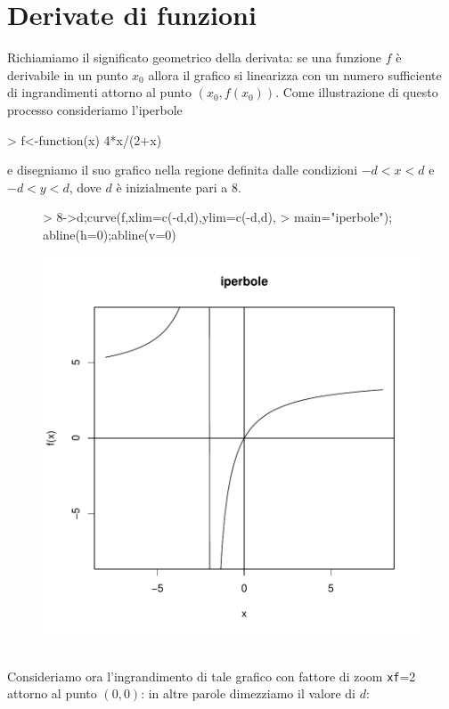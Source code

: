 \documentclass[onecolumn,11pt]{book}
\begin{document}
 \section{Derivate di funzioni}
Richiamiamo il significato geometrico della derivata: se una funzione $f$ \`e derivabile in un punto $x_0$ allora il grafico si linearizza con un numero sufficiente di ingrandimenti attorno al punto $(x_0,f(x_0))$. 
Come illustrazione di questo processo consideriamo l'iperbole
\begin{Schunk}
\begin{Sinput}
>  f<-function(x) 4*x/(2+x)  
\end{Sinput}
\end{Schunk}
e disegniamo il suo grafico nella regione definita dalle condizioni $-d<x<d$ e $-d<y<d$, dove $d$ \`e inizialmente pari a 8.
\begin{figure}
\begin{Schunk}
\begin{Sinput}
> 8->d;curve(f,xlim=c(-d,d),ylim=c(-d,d),
> main="iperbole"); abline(h=0);abline(v=0)
\end{Sinput}
\end{Schunk}
\includegraphics{statisticaconR-080}
\end{figure}
\\
Consideriamo ora l'ingrandimento di tale grafico con fattore di zoom \texttt{xf}=2 attorno al punto $(0,0)$: in altre parole dimezziamo il valore di $d$:
\end{document}
